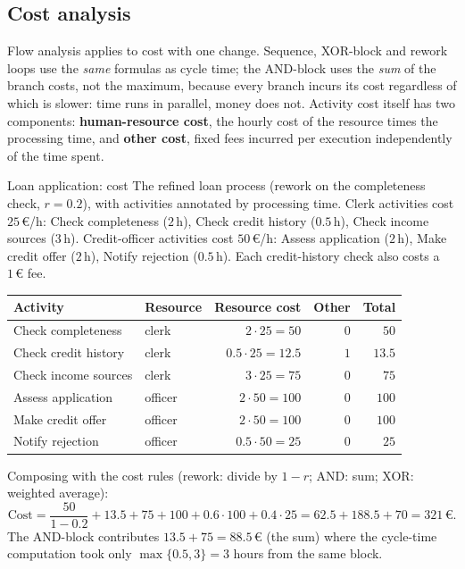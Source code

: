 \subsection{Cost analysis}

Flow analysis applies to cost with one change. Sequence, XOR-block and rework loops use the \emph{same} formulas as cycle time; the AND-block uses the \emph{sum} of the branch costs, not the maximum, because every branch incurs its cost regardless of which is slower: time runs in parallel, money does not. Activity cost itself has two components: \textbf{human-resource cost}, the hourly cost of the resource times the processing time, and \textbf{other cost}, fixed fees incurred per execution independently of the time spent.
\begin{examplebox}{Loan application: cost}
The refined loan process (rework on the completeness check, $r = 0.2$), with activities annotated by processing time. Clerk activities cost $25\,\euro$/h: Check completeness ($2$\,h), Check credit history ($0.5$\,h), Check income sources ($3$\,h). Credit-officer activities cost $50\,\euro$/h: Assess application ($2$\,h), Make credit offer ($2$\,h), Notify rejection ($0.5$\,h). Each credit-history check also costs a $1\,\euro$ fee.
\begin{center}
\begin{tabular}{llrrr}
\toprule
\textbf{Activity} & \textbf{Resource} & \textbf{Resource cost} & \textbf{Other} & \textbf{Total}\\
\midrule
Check completeness   & clerk   & $2 \cdot 25 = 50$     & $0$ & $50$\\
Check credit history & clerk   & $0.5 \cdot 25 = 12.5$ & $1$ & $13.5$\\
Check income sources & clerk   & $3 \cdot 25 = 75$     & $0$ & $75$\\
Assess application   & officer & $2 \cdot 50 = 100$    & $0$ & $100$\\
Make credit offer    & officer & $2 \cdot 50 = 100$    & $0$ & $100$\\
Notify rejection     & officer & $0.5 \cdot 50 = 25$   & $0$ & $25$\\
\bottomrule
\end{tabular}
\end{center}
Composing with the cost rules (rework: divide by $1 - r$; AND: sum; XOR: weighted average):
\[\text{Cost} = \frac{50}{1 - 0.2} + 13.5 + 75 + 100 + 0.6 \cdot 100 + 0.4 \cdot 25 = 62.5 + 188.5 + 70 = 321\,\euro.\]
The AND-block contributes $13.5 + 75 = 88.5\,\euro$ (the sum) where the cycle-time computation took only $\max\{0.5, 3\} = 3$ hours from the same block.
\end{examplebox}

